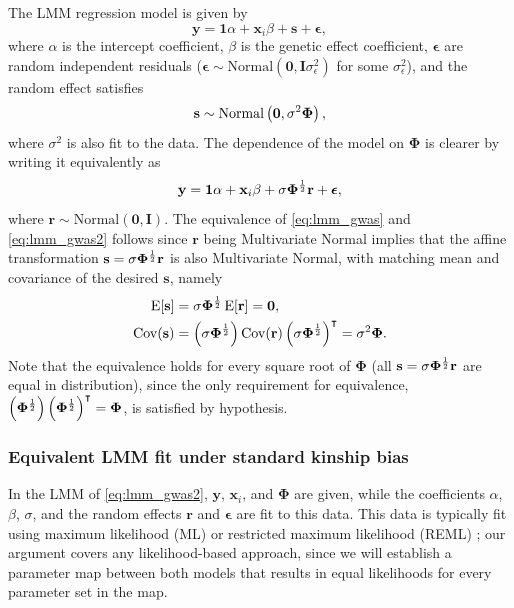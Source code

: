 \documentclass[11pt]{article}
\newcommand{\kinMat}{%
  \ensuremath{%
    \mathbf{\Phi}
  }%
  \xspace%
}%
\begin{document}
The LMM regression model is given by
\begin{equation}
  \label{eq:lmm_gwas}
  \mathbf{y}
  =
  \mathbf{1} \alpha + \mathbf{x}_i \beta + \mathbf{s} + \boldsymbol{\epsilon}
  ,
\end{equation}
where $\alpha$ is the intercept coefficient,
$\beta$ is the genetic effect coefficient,
$\boldsymbol{\epsilon}$ are random independent residuals ($\boldsymbol{\epsilon} \sim \text{Normal}(\mathbf{0}, \mathbf{I} \sigma^2_\epsilon)$ for some $\sigma^2_\epsilon$),
and the random effect satisfies \citep{sul_population_2018}
$$
\mathbf{s} \sim \text{Normal} \left( \mathbf{0}, \sigma^2 \kinMat \right),
$$
where $\sigma^2$ is also fit to the data.
The dependence of the model on \kinMat is clearer by writing it equivalently as
\begin{equation}
  \label{eq:lmm_gwas2}
  \mathbf{y}
  =
  \mathbf{1} \alpha + \mathbf{x}_i \beta + \sigma \kinMat^\frac{1}{2} \mathbf{r} + \boldsymbol{\epsilon}
  ,
\end{equation}
where $\mathbf{r} \sim \text{Normal} \left( \mathbf{0}, \mathbf{I} \right)$.
The equivalence of \cref{eq:lmm_gwas} and \cref{eq:lmm_gwas2} follows since $\mathbf{r}$ being Multivariate Normal implies that the affine transformation $\mathbf{s} = \sigma \kinMat^\frac{1}{2} \mathbf{r}$ is also Multivariate Normal, with matching mean and covariance of the desired $\mathbf{s}$, namely
\begin{align*}
  \E[ \mathbf{s} ]
  &=
    \sigma \kinMat^\frac{1}{2} \E[ \mathbf{r} ]
    = \mathbf{0},
  \\
  \Cov( \mathbf{s} )
  &= \left( \sigma \kinMat^\frac{1}{2} \right) \Cov( \mathbf{r} ) \left( \sigma \kinMat^\frac{1}{2} \right)^\intercal
    = \sigma^2 \kinMat
    .
\end{align*}
Note that the equivalence holds for every square root of \kinMat (all $\mathbf{s} = \sigma \kinMat^\frac{1}{2} \mathbf{r}$ are equal in distribution), since the only requirement for equivalence,
$\left( \kinMat^\frac{1}{2} \right) \left( \kinMat^\frac{1}{2} \right)^\intercal = \kinMat$,
is satisfied by hypothesis.

\subsubsection{Equivalent LMM fit under standard kinship bias}

In the LMM of \cref{eq:lmm_gwas2}, $\mathbf{y}$, $\mathbf{x}_i$, and \kinMat are given, while the coefficients $\alpha$, $\beta$, $\sigma$, and the random effects $\mathbf{r}$ and $\boldsymbol{\epsilon}$ are fit to this data.
This data is typically fit using maximum likelihood (ML) or restricted maximum likelihood (REML) \citep{kang_efficient_2008}; our argument covers any likelihood-based approach, since we will establish a parameter map between both models that results in equal likelihoods for every parameter set in the map.
\end{document}
